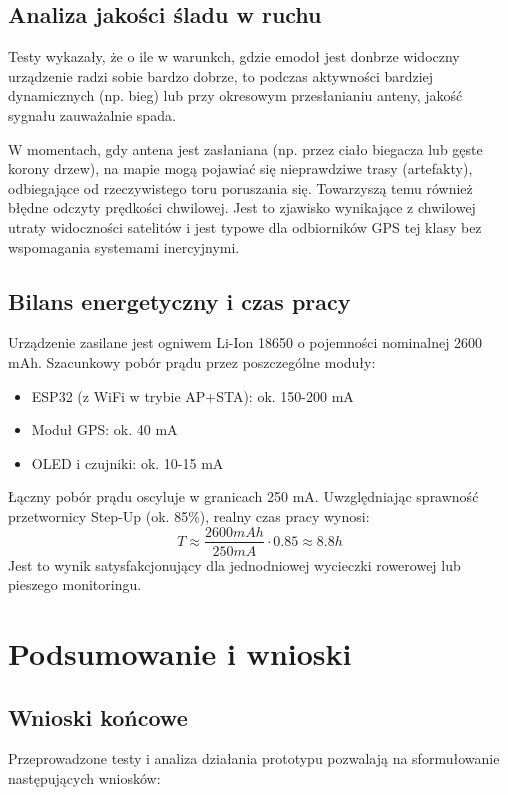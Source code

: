\documentclass[12pt, a4paper]{EE-dyplom}
\begin{document}
\subsection{Analiza jakości śladu w ruchu}
Testy wykazały, że o ile w warunkch, gdzie emodoł jest donbrze widoczny urządzenie radzi sobie bardzo dobrze, 
to podczas aktywności bardziej dynamicznych (np. bieg) 
lub przy okresowym przesłanianiu anteny, jakość sygnału zauważalnie spada.

W momentach, gdy antena jest zasłaniana (np. przez ciało biegacza lub gęste korony drzew), na mapie mogą pojawiać się nieprawdziwe trasy (artefakty), odbiegające od rzeczywistego toru poruszania się. Towarzyszą temu również błędne odczyty prędkości chwilowej. Jest to zjawisko wynikające z chwilowej utraty widoczności satelitów i jest typowe dla odbiorników GPS tej klasy bez wspomagania systemami inercyjnymi.

\subsection{Bilans energetyczny i czas pracy}
Urządzenie zasilane jest ogniwem Li-Ion 18650 o pojemności nominalnej 2600 mAh.
Szacunkowy pobór prądu przez poszczególne moduły:
\begin{itemize}
    \item ESP32 (z WiFi w trybie AP+STA): ok. 150-200 mA \cite{esp32_power}
    \item Moduł GPS: ok. 40 mA \cite{roboticsbd_neo6m}
    \item OLED i czujniki: ok. 10-15 mA \cite{bitbank_oled}
\end{itemize}
Łączny pobór prądu oscyluje w granicach 250 mA. Uwzględniając sprawność przetwornicy Step-Up (ok. 85\%), realny czas pracy wynosi:
\[
T \approx \frac{2600 mAh}{250 mA} \cdot 0.85 \approx 8.8 h
\]
Jest to wynik satysfakcjonujący dla jednodniowej wycieczki rowerowej lub pieszego monitoringu.



\section{Podsumowanie i wnioski}

\subsection{Wnioski końcowe}
Przeprowadzone testy i analiza działania prototypu pozwalają na sformułowanie następujących wniosków:
\end{document}
